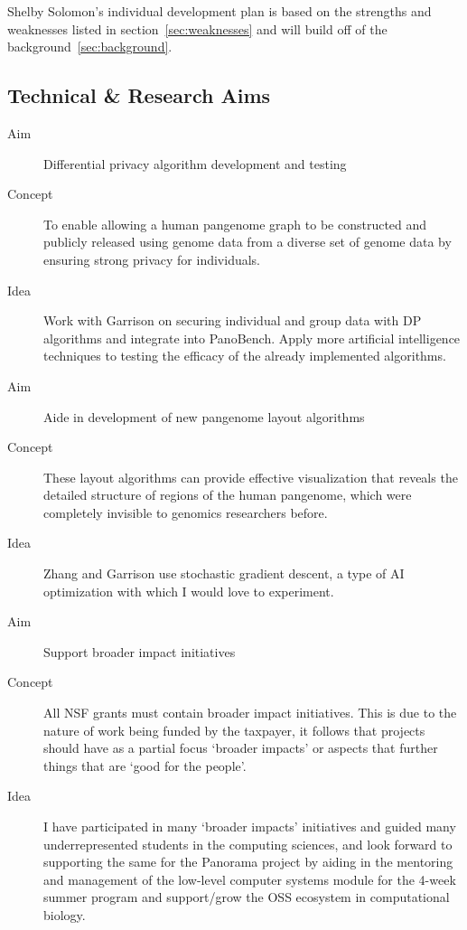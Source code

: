 Shelby Solomon's individual development plan is based on the strengths and weaknesses listed in section~\ref{sec:weaknesses} and will build off of the background~\ref{sec:background}.

\subsection{Technical \& Research Aims}

\begin{description}
	\item[Aim] Differential privacy algorithm development and testing
	\item[Concept] To enable allowing a human pangenome graph to be constructed and publicly released using genome data from a diverse set of genome data by ensuring strong privacy for individuals.
	\item[Idea] Work with Garrison on securing individual and group data with DP algorithms and integrate into PanoBench. Apply more artificial intelligence techniques to testing the efficacy of the already implemented algorithms.
\end{description}

\begin{description}
	\item[Aim] Aide in development of new pangenome layout algorithms
	\item[Concept] These layout algorithms can provide effective visualization that reveals the detailed structure of regions of the human pangenome, which were completely invisible to genomics researchers before.
	\item[Idea] Zhang and Garrison use stochastic gradient descent, a type of AI optimization with which I would love to experiment.
\end{description}

\begin{description}
	\item[Aim] Support broader impact initiatives 
	\item[Concept] All NSF grants must contain broader impact initiatives. This is due to the nature of work being funded by the taxpayer, it follows that projects should have as a partial focus `broader impacts' or aspects that further things that are `good for the people'.
	\item[Idea] I have participated in many `broader impacts' initiatives and guided many underrepresented students in the computing sciences, and look forward to supporting the same for the Panorama project by aiding in the mentoring and management of the low-level computer systems module for the 4-week summer program and support/grow the OSS ecosystem in computational biology.
\end{description}

